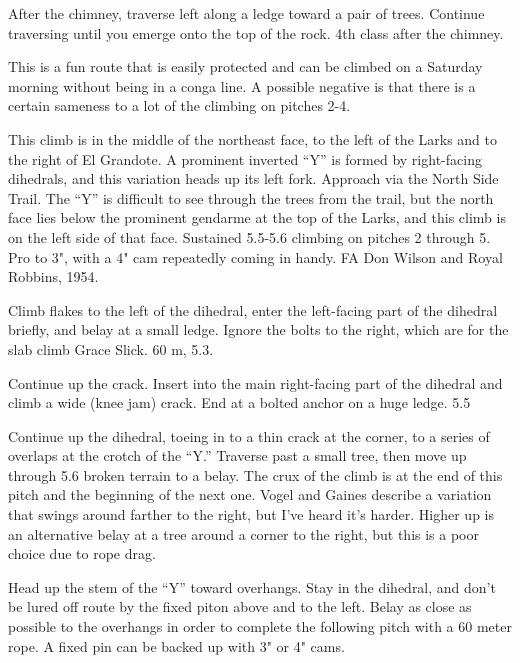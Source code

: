 \documentclass{tahquitz}
\begin{document}
 After the chimney, traverse left along a ledge toward a pair of trees. Continue
traversing until you emerge onto the top of the rock. 4th class after the chimney.




This is a fun route that is easily protected and
can be climbed on a Saturday morning without being in a conga line. A
possible negative is that there is a certain sameness to a lot of the
climbing on pitches 2-4.

This climb is in the middle of the northeast face, to the left of the
Larks and to the right of El Grandote. A prominent inverted ``Y'' is
formed by right-facing dihedrals, and this variation heads up its
left fork. Approach via the North Side Trail. The ``Y'' is difficult to
see through the trees from the trail, but the north face lies below
the prominent gendarme at the top of the Larks, and this climb is on
the left side of that face. Sustained 5.5-5.6 climbing on pitches 2
through 5. Pro to 3", with  a 4" cam repeatedly coming in handy.
FA Don Wilson and Royal Robbins, 1954.

 Climb flakes to the left of the dihedral, enter the left-facing
part of the dihedral briefly, and belay at a small ledge. Ignore the
bolts to the right, which are for the slab climb Grace Slick. 60 m,
5.3.

 Continue up the crack. Insert into the main right-facing part of
the dihedral and climb a wide (knee jam) crack. End at a bolted
anchor on a huge ledge. 5.5

 Continue up the dihedral, toeing in to a thin crack at the
corner, to a series of overlaps at the crotch of the ``Y.'' Traverse
past a small tree, then move up through 5.6 broken terrain to a
belay. The crux of the climb is at the end of this pitch and the
beginning of the next one. Vogel and Gaines describe a variation that
swings around farther to the right, but I've heard it's harder.
Higher up is an alternative belay at a tree around a corner to the
right, but this is a poor choice due to rope drag.

 Head up the stem of the ``Y'' toward overhangs. Stay in the
dihedral, and don't be lured off route by the fixed piton above and
to the left. Belay as close as possible to the overhangs in order to
complete the following pitch with a 60 meter rope. A fixed pin can be
backed up with 3" or 4" cams.
\end{document}
